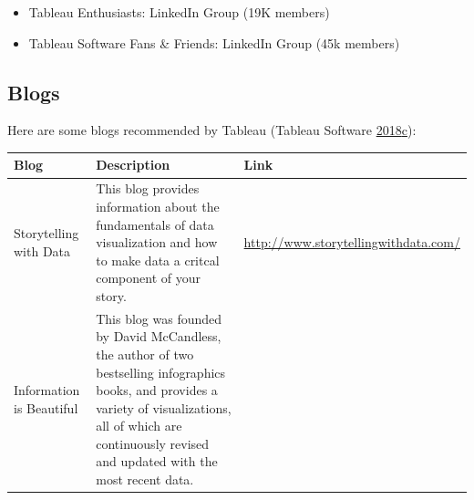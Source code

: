 \documentclass[]{book}
\providecommand{\tightlist}{%
  \setlength{\itemsep}{0pt}\setlength{\parskip}{0pt}}
\begin{document}
\begin{itemize}
\tightlist
\item
  Tableau Enthusiasts: LinkedIn Group (19K members)
\item
  Tableau Software Fans \& Friends: LinkedIn Group (45k members)
\end{itemize}

\hypertarget{blogs}{%
\subsection{Blogs}\label{blogs}}

Here are some blogs recommended by Tableau (Tableau Software \protect\hyperlink{ref-Top_10_Blogs}{2018}\protect\hyperlink{ref-Top_10_Blogs}{c}):

\begin{longtable}[]{@{}lll@{}}
\toprule
\begin{minipage}[b]{0.07\columnwidth}\raggedright
\textbf{Blog}\strut
\end{minipage} & \begin{minipage}[b]{0.77\columnwidth}\raggedright
\textbf{Description}\strut
\end{minipage} & \begin{minipage}[b]{0.07\columnwidth}\raggedright
\textbf{Link}\strut
\end{minipage}\tabularnewline
\midrule
\endhead
\begin{minipage}[t]{0.07\columnwidth}\raggedright
Storytelling with Data\strut
\end{minipage} & \begin{minipage}[t]{0.77\columnwidth}\raggedright
This blog provides information about the fundamentals of data visualization and how to make data a critcal component of your story.\strut
\end{minipage} & \begin{minipage}[t]{0.07\columnwidth}\raggedright
\url{http://www.storytellingwithdata.com/}\strut
\end{minipage}\tabularnewline
\begin{minipage}[t]{0.07\columnwidth}\raggedright
Information is Beautiful\strut
\end{minipage} & \begin{minipage}[t]{0.77\columnwidth}\raggedright
This blog was founded by David McCandless, the author of two bestselling infographics books, and provides a variety of visualizations, all of which are continuously revised and updated with the most recent data.\strut
\end{minipage} & \begin{minipage}[t]{0.07\columnwidth}\raggedright

\end{minipage}
\end{longtable}
\end{document}
